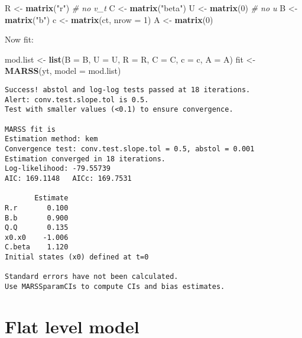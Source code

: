 \documentclass[12pt,]{book}
\newenvironment{Shaded}{\begin{snugshade}}{\end{snugshade}}
\newcommand{\CommentTok}[1]{\textcolor[rgb]{0.56,0.35,0.01}{\textit{#1}}}
\newcommand{\DataTypeTok}[1]{\textcolor[rgb]{0.13,0.29,0.53}{#1}}
\newcommand{\DecValTok}[1]{\textcolor[rgb]{0.00,0.00,0.81}{#1}}
\newcommand{\KeywordTok}[1]{\textcolor[rgb]{0.13,0.29,0.53}{\textbf{#1}}}
\newcommand{\NormalTok}[1]{#1}
\newcommand{\StringTok}[1]{\textcolor[rgb]{0.31,0.60,0.02}{#1}}
\begin{document}
\begin{Shaded}
\begin{Highlighting}[]
\NormalTok{R <-}\StringTok{ }\KeywordTok{matrix}\NormalTok{(}\StringTok{"r"}\NormalTok{)  }\CommentTok{# no v_t}
\NormalTok{C <-}\StringTok{ }\KeywordTok{matrix}\NormalTok{(}\StringTok{"beta"}\NormalTok{)}
\NormalTok{U <-}\StringTok{ }\KeywordTok{matrix}\NormalTok{(}\DecValTok{0}\NormalTok{)  }\CommentTok{# no u}
\NormalTok{B <-}\StringTok{ }\KeywordTok{matrix}\NormalTok{(}\StringTok{"b"}\NormalTok{)}
\NormalTok{c <-}\StringTok{ }\KeywordTok{matrix}\NormalTok{(ct, }\DataTypeTok{nrow =} \DecValTok{1}\NormalTok{)}
\NormalTok{A <-}\StringTok{ }\KeywordTok{matrix}\NormalTok{(}\DecValTok{0}\NormalTok{)}
\end{Highlighting}
\end{Shaded}

Now fit:

\begin{Shaded}
\begin{Highlighting}[]
\NormalTok{mod.list <-}\StringTok{ }\KeywordTok{list}\NormalTok{(}\DataTypeTok{B =}\NormalTok{ B, }\DataTypeTok{U =}\NormalTok{ U, }\DataTypeTok{R =}\NormalTok{ R, }\DataTypeTok{C =}\NormalTok{ C, }\DataTypeTok{c =}\NormalTok{ c, }\DataTypeTok{A =}\NormalTok{ A)}
\NormalTok{fit <-}\StringTok{ }\KeywordTok{MARSS}\NormalTok{(yt, }\DataTypeTok{model =}\NormalTok{ mod.list)}
\end{Highlighting}
\end{Shaded}

\begin{verbatim}
Success! abstol and log-log tests passed at 18 iterations.
Alert: conv.test.slope.tol is 0.5.
Test with smaller values (<0.1) to ensure convergence.

MARSS fit is
Estimation method: kem 
Convergence test: conv.test.slope.tol = 0.5, abstol = 0.001
Estimation converged in 18 iterations. 
Log-likelihood: -79.55739 
AIC: 169.1148   AICc: 169.7531   
 
       Estimate
R.r       0.100
B.b       0.900
Q.Q       0.135
x0.x0    -1.006
C.beta    1.120
Initial states (x0) defined at t=0

Standard errors have not been calculated. 
Use MARSSparamCIs to compute CIs and bias estimates.
\end{verbatim}

\hypertarget{flat-level-model}{%
\section{Flat level model}\label{flat-level-model}}
\end{document}
